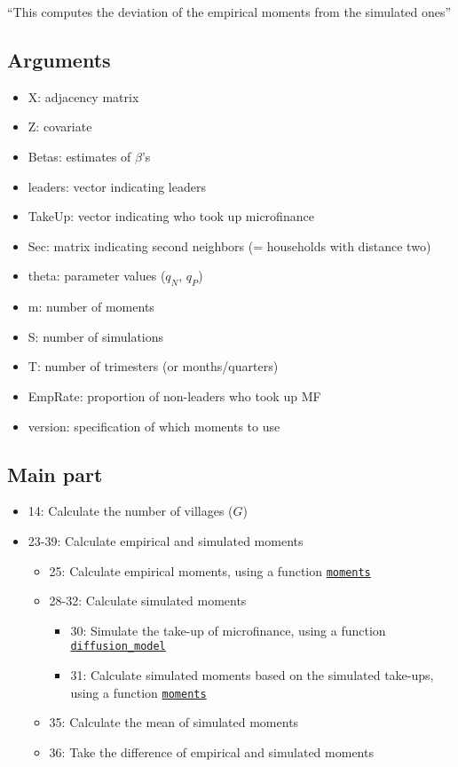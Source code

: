 \documentclass[10pt,letterpaper]{article}
\begin{document}
``This computes the deviation of the empirical moments from the simulated ones''

\subsection*{Arguments}
\begin{itemize}
  \item X: adjacency matrix
  \item Z: covariate
  \item Betas: estimates of $\beta$'s 
  \item leaders: vector indicating leaders
  \item TakeUp: vector indicating who took up microfinance
  \item Sec: matrix indicating second neighbors (= households with distance two)
  \item theta: parameter values ($q_N$, $q_P$)
  \item m: number of moments
  \item S: number of simulations
  \item T: number of trimesters (or months/quarters)
  \item EmpRate: proportion of non-leaders who took up MF
  \item version: specification of which moments to use
\end{itemize}

\subsection*{Main part}
\begin{itemize}
  \item 14: Calculate the number of villages ($G$)
  \item 23-39: Calculate empirical and simulated moments
    \begin{itemize}
      \item 25: Calculate empirical moments, using a function \hyperref[moments]{\texttt{moments}}
      \item 28-32: Calculate simulated moments
        \begin{itemize}
          \item 30: Simulate the take-up of microfinance, using a function \hyperref[diffusion_model]{\texttt{diffusion\_model}}
          \item 31: Calculate simulated moments based on the simulated take-ups, using a function \hyperref[moments]{\texttt{moments}}
        \end{itemize}
      \item 35: Calculate the mean of simulated moments
      \item 36: Take the difference of empirical and simulated moments
    \end{itemize}
\end{itemize}
\end{document}
